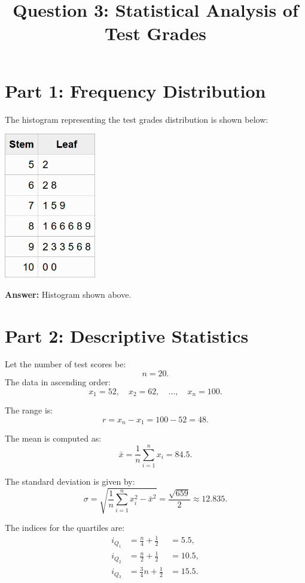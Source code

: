 \documentclass[12pt]{article}
\title{Question 3: Statistical Analysis of Test Grades}
\author{}
\date{}
\begin{document}
\maketitle
\onehalfspacing

\section*{Part 1: Frequency Distribution}
The histogram representing the test grades distribution is shown below:

\begin{center}
    \includegraphics[width=0.3\textwidth]{Q3-P1-stemplot.png}
\end{center}

\textbf{Answer:} Histogram shown above.

\bigskip

\section*{Part 2: Descriptive Statistics}
Let the number of test scores be:
\[
n = 20.
\]
The data in ascending order:
\[
x_1 = 52, \quad x_2 = 62, \quad \dots, \quad x_n = 100.
\]

The range is:
\[
r = x_n - x_1 = 100 - 52 = 48.
\]

The mean is computed as:
\[
\bar{x} = \frac{1}{n} \sum_{i=1}^{n} x_i = 84.5.
\]

The standard deviation is given by:
\[
\sigma = \sqrt{\frac{1}{n} \sum_{i=1}^{n} x_i^2 - \bar{x}^2} = \frac{\sqrt{659}}{2} \approx 12.835.
\]

The indices for the quartiles are:
\[
\begin{alignedat}{2}
i_{Q_1} &= \frac{n}{4}+\frac{1}{2} &= 5.5, \\
i_{Q_2} &= \frac{n}{2}+\frac{1}{2} &= 10.5, \\
i_{Q_3} &= \frac{3}{4}n+\frac{1}{2} &= 15.5.
\end{alignedat}
\]
\end{document}
